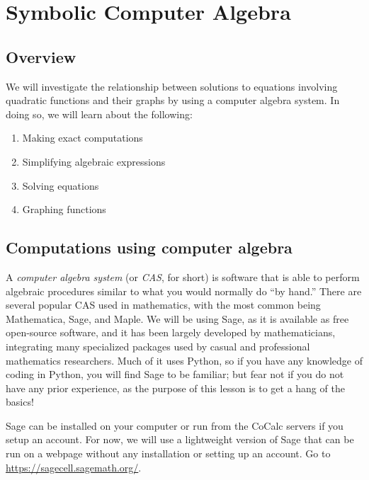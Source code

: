 
\chapter{Symbolic Computer Algebra}


\section{Overview}

We will investigate the relationship between solutions to equations
involving quadratic functions and their graphs by using a computer
algebra system. In doing so, we will learn about the following:
\begin{enumerate}
	\item Making exact computations
	\item Simplifying algebraic expressions
	\item Solving equations
	\item Graphing functions
\end{enumerate}

\section{Computations using computer algebra}

A \textit{computer algebra system} (or \textit{CAS}, for short) is software
that is able to perform algebraic procedures similar to what you would
normally do ``by hand.'' There are several popular CAS used in mathematics,
with the most common being Mathematica, Sage, and Maple. We will
be using Sage, as it is available as free open-source software, and it has been
largely developed by mathematicians, integrating many specialized packages
used by casual and professional mathematics researchers. Much of it
uses Python, so if you have any knowledge of coding in Python, you will find
Sage to be familiar; but fear not if you do not have any prior experience,
as the purpose of this lesson is to get a hang of the basics!

Sage can be installed on your computer or run from the CoCalc servers
if you setup an account. For now, we will use a lightweight version of Sage
that can be run on a webpage without any installation or setting up an
account. Go to \url{https://sagecell.sagemath.org/}.

